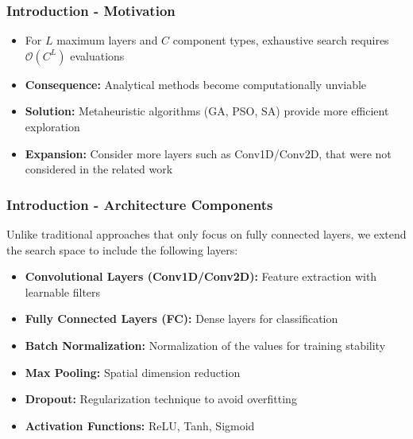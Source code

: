 \documentclass{beamer}
\begin{document}
    \begin{frame}
        \frametitle{Introduction - Motivation}
        \begin{itemize}
            \item For $L$ maximum layers and $C$ component types, exhaustive search requires $\mathcal{O}(C^L)$ evaluations
            \item \textbf{Consequence:} Analytical methods become computationally unviable
            \item \textbf{Solution:} Metaheuristic algorithms (GA, PSO, SA) provide more efficient exploration \cite{idrissi_genetic_2016,kuo_neural_2022,jamous_neural_2021,carvalho_particle_2007,shrestha_optimizing_2019}
            \item \textbf{Expansion:} Consider more layers such as Conv1D/Conv2D, that were not considered in the related work
        \end{itemize}
    \end{frame}

    \begin{frame}
        \frametitle{Introduction - Architecture Components}
        Unlike traditional approaches that only focus on fully connected layers, we extend the search space to include the following layers:
        \begin{itemize}
            \item \textbf{Convolutional Layers (Conv1D/Conv2D):} Feature extraction with learnable filters
            \item \textbf{Fully Connected Layers (FC):} Dense layers for classification
            \item \textbf{Batch Normalization:} Normalization of the values for training stability
            \item \textbf{Max Pooling:} Spatial dimension reduction
            \item \textbf{Dropout:} Regularization technique to avoid overfitting
            \item \textbf{Activation Functions:} ReLU, Tanh, Sigmoid
        \end{itemize}
    \end{frame}
\end{document}
